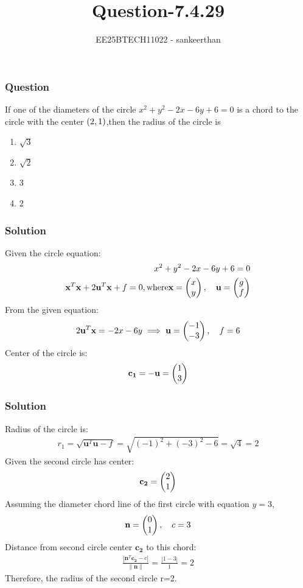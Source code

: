 \documentclass{beamer}
\title{Question-7.4.29}
\author{EE25BTECH11022 - sankeerthan}
\date{}
\begin{document}
\frame{\titlepage}

\begin{frame}
\frametitle{Question}
If one of the diameters of the circle $x^2 + y^2 - 2x - 6y + 6 = 0$ is a chord to the circle with the center $\left(2,1\right)$,then the radius of the circle is 
\begin{enumerate}
     \item $\sqrt{3}$
     \item $\sqrt{2}$
     \item $3$
     \item $2$
\end{enumerate}
\end{frame}

\begin{frame}
\frametitle{Solution}
Given the circle equation:
\begin{align}
x^2 + y^2 - 2x - 6y + 6 = 0 \\
\mathbf{x}^T \mathbf{x} + 2\mathbf{u}^T \mathbf{x} + f = 0,\text{where}
\mathbf{x} = \begin{pmatrix}x \\ y\end{pmatrix}, \quad \mathbf{u} = \begin{pmatrix}g \\ f\end{pmatrix}
\end{align}
From the given equation:
\begin{align}
2\mathbf{u}^T \mathbf{x} = -2x - 6y \implies \mathbf{u} = \begin{pmatrix}-1 \\ -3\end{pmatrix}, \quad f = 6
\end{align}
Center of the circle is:
\begin{align}
\mathbf{c_1} = -\mathbf{u} = \begin{pmatrix}1 \\ 3\end{pmatrix}
\end{align}
\end{frame}
\begin{frame}
\frametitle{Solution}
Radius of the circle is:
\begin{align}
r_1 =\sqrt{\mathbf{u}^T \mathbf{u} - f} =\sqrt{(-1)^2 + (-3)^2 - 6} =\sqrt{4} = 2
\end{align}
Given the second circle has center:
\begin{align}
\mathbf{c_2} = \begin{pmatrix}2 \\ 1\end{pmatrix}
\end{align}
Assuming the diameter chord line of the first circle with equation $y=3$,
\begin{align}
\mathbf{n} = \begin{pmatrix}0 \\ 1\end{pmatrix}, \quad c = 3
\end{align}
Distance from second circle center \(\mathbf{c_2}\) to this chord:
\begin{align}
\frac{|\mathbf{n}^T \mathbf{c_2} - c|}{\|\mathbf{n}\|} = \frac{|1 - 3|}{1} = 2
\end{align}
Therefore, the radius of the second circle  r=2.
\end{frame}
\end{document}
